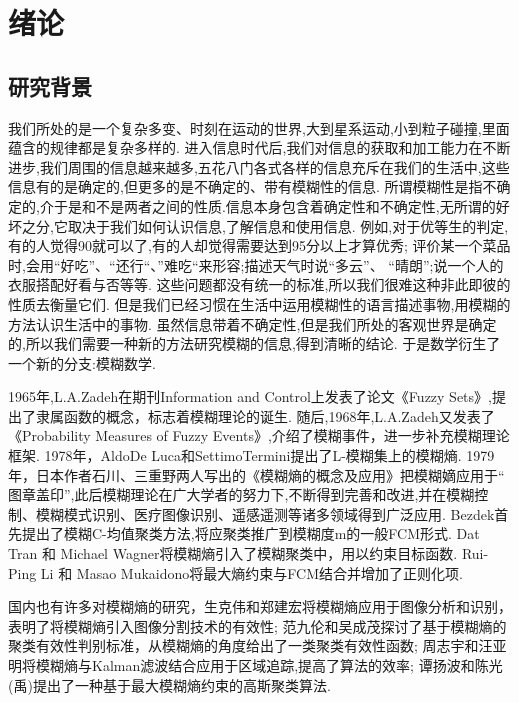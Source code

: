 \chapter[绪论]{绪论}
\section{研究背景}
\par
我们所处的是一个复杂多变、时刻在运动的世界,大到星系运动,小到粒子碰撞,里面蕴含的规律都是复杂多样的.
进入信息时代后,我们对信息的获取和加工能力在不断进步,我们周围的信息越来越多,五花八门各式各样的信息充斥在我们的生活中,这些信息有的是确定的,但更多的是不确定的、带有模糊性的信息.
所谓模糊性是指不确定的,介于是和不是两者之间的性质.信息本身包含着确定性和不确定性,无所谓的好坏之分,它取决于我们如何认识信息,了解信息和使用信息.
例如,对于优等生的判定,有的人觉得90就可以了,有的人却觉得需要达到95分以上才算优秀;
评价某一个菜品时,会用“好吃”、“还行“、”难吃“来形容;描述天气时说“多云”、 “晴朗”;说一个人的衣服搭配好看与否等等.
这些问题都没有统一的标准,所以我们很难这种非此即彼的性质去衡量它们.
但是我们已经习惯在生活中运用模糊性的语言描述事物,用模糊的方法认识生活中的事物.
虽然信息带着不确定性,但是我们所处的客观世界是确定的,所以我们需要一种新的方法研究模糊的信息,得到清晰的结论.
于是数学衍生了一个新的分支:模糊数学.
\par
1965年,L.A.Zadeh在期刊Information and Control上发表了论文《Fuzzy Sets》\cite{ZADEH1965fuzzy},提出了隶属函数的概念，标志着模糊理论的诞生.
随后,1968年,L.A.Zadeh又发表了《Probability Measures of Fuzzy Events》\cite{zadeh1968probability},介绍了模糊事件，进一步补充模糊理论框架.
1978年，AldoDe Luca和SettimoTermini\cite{1974Entropy}提出了L-模糊集上的模糊熵.
1979年，日本作者石川、三重野两人写出的《模糊熵的概念及应用》把模糊嫡应用于“ 图章盖印”,此后模糊理论在广大学者的努力下,不断得到完善和改进,并在模糊控制、模糊模式识别、医疗图像识别、遥感遥测等诸多领域得到广泛应用.
Bezdek首先提出了模糊C-均值聚类方法\cite{刘敬伟2007Bezdek},将应聚类推广到模糊度m的一般FCM形式.
Dat Tran 和 Michael Wagner\cite{2000Fuzzy}将模糊熵引入了模糊聚类中，用以约束目标函数.
Rui-Ping Li 和 Masao Mukaidono\cite{1995A}将最大熵约束与FCM结合并增加了正则化项.
\par 
国内也有许多对模糊熵的研究，生克伟和郑建宏\cite{生克伟1998一种新的模糊熵图象分割方法}将模糊熵应用于图像分析和识别，表明了将模糊熵引入图像分割技术的有效性;
范九伦和吴成茂\cite{范九伦2001基于模糊熵的聚类有效性函数}探讨了基于模糊熵的聚类有效性判别标准，从模糊熵的角度给出了一类聚类有效性函数;
周志宇和汪亚明将模糊熵与Kalman滤波结合应用于区域追踪,提高了算法的效率;
谭扬波和陈光 (禹)\cite{谭扬波一种基于最大模糊熵的高斯聚类算法}提出了一种基于最大模糊熵约束的高斯聚类算法.

